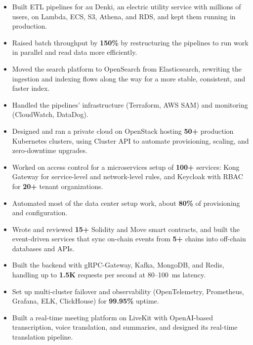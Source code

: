 \jobVietlink
\begin{itemize}
    \item Built ETL pipelines for au Denki, an electric utility service with millions of users, on Lambda, ECS, S3, Athena, and RDS, and kept them running in production. %
    \item Raised batch throughput by \textbf{150\%} by restructuring the pipelines to run work in parallel and read data more efficiently. %
    \item Moved the search platform to OpenSearch from Elasticsearch, rewriting the ingestion and indexing flows along the way for a more stable, consistent, and faster index. %
    \item Handled the pipelines' infrastructure (Terraform, AWS SAM) and monitoring (CloudWatch, DataDog). %
\end{itemize}

\jobVNPAY
\begin{itemize}
    \item Designed and ran a private cloud on OpenStack hosting \textbf{50+} production Kubernetes clusters, using Cluster API to automate provisioning, scaling, and zero-downtime upgrades. %
    \item Worked on access control for a microservices setup of \textbf{100+} services: Kong Gateway for service-level and network-level rules, and Keycloak with RBAC for \textbf{20+} tenant organizations. %
    \item Automated most of the data center setup work, about \textbf{80\%} of provisioning and configuration. %
\end{itemize}

\jobEsolLabs
\begin{itemize}
    \item Wrote and reviewed \textbf{15+} Solidity and Move smart contracts, and built the event-driven services that sync on-chain events from \textbf{5+} chains into off-chain databases and APIs. %
\end{itemize}


\projDattingQ
\begin{itemize}
    \item Built the backend with gRPC-Gateway, Kafka, MongoDB, and Redis, handling up to \textbf{1.5K} requests per second at 80--100~ms latency. %
    \item Set up multi-cluster failover and observability (OpenTelemetry, Prometheus, Grafana, ELK, ClickHouse) for \textbf{99.95\%} uptime. %
\end{itemize}

\projMeetQ
\begin{itemize}
    \item Built a real-time meeting platform on LiveKit with OpenAI-based transcription, voice translation, and summaries, and designed its real-time translation pipeline. %
\end{itemize}

\cveducation


